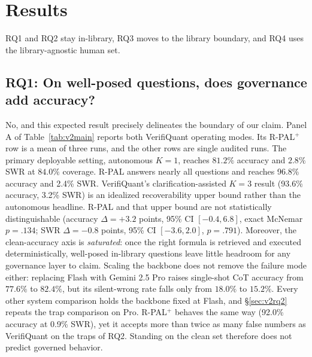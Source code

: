 \documentclass[sigconf]{acmart}
\newcommand{\vqAccAll}{93.6\%}
\newcommand{\vqSWRAll}{3.2\%}
\newcommand{\rpalAccAll}{96.8\%}
\newcommand{\rpalSWRAll}{2.4\%}
\newcommand{\govPromptAccAll}{92.0\%}
\newcommand{\govPromptSWRAll}{0.9\%}
\begin{document}
\section{Results}\label{sec:v2res}
RQ1 and RQ2 stay in-library, RQ3 moves to the library boundary, and RQ4 uses the library-agnostic human set.
\subsection{RQ1: On well-posed questions, does governance add accuracy?}
No, and this expected result precisely delineates the boundary of our claim.
Panel A of Table~\ref{tab:v2main} reports both VerifiQuant operating modes. Its R-PAL$^{+}$ row is a mean of three runs, and the other rows are single audited runs. The primary deployable setting, autonomous $K{=}1$, reaches $81.2\%$ accuracy and $2.8\%$ SWR at $84.0\%$ coverage. R-PAL answers nearly all questions and reaches \rpalAccAll{} accuracy and \rpalSWRAll{} SWR. VerifiQuant's clarification-assisted $K{=}3$ result (\vqAccAll{} accuracy, \vqSWRAll{} SWR) is an idealized recoverability upper bound rather than the autonomous headline. R-PAL and that upper bound are not statistically distinguishable (accuracy $\Delta{=}{+}3.2$ points, 95\% CI $[-0.4, 6.8]$, exact McNemar $p{=}.134$; SWR $\Delta{=}{-}0.8$ points, 95\% CI $[-3.6, 2.0]$, $p{=}.791$). %
Moreover, the clean-accuracy axis is \emph{saturated}: once the right formula is retrieved and executed deterministically, well-posed in-library questions leave little headroom for any governance layer to claim.
Scaling the backbone does not remove the failure mode either: replacing Flash with Gemini 2.5 Pro raises single-shot CoT accuracy from $77.6\%$ to $82.4\%$, but its silent-wrong rate falls only from $18.0\%$ to $15.2\%$. Every other system comparison holds the backbone fixed at Flash, and \S\ref{sec:v2rq2} repeats the trap comparison on Pro.
R-PAL$^{+}$ behaves the same way (\govPromptAccAll{} accuracy at \govPromptSWRAll{} SWR), yet it accepts more than twice as many false numbers as VerifiQuant on the traps of RQ2. Standing on the clean set therefore does not predict governed behavior.
\end{document}
